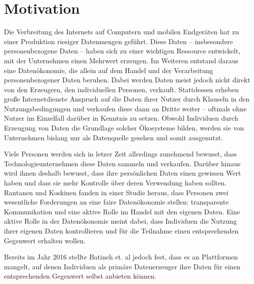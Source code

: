 \section{Motivation}
Die Verbreitung des Internets auf Computern und mobilen Endgeräten hat zu einer Produktion riesiger Datenmengen geführt. Diese Daten -- insbesondere personenbezogene Daten -- haben sich zu einer wichtigen Ressource entwickelt, mit der Unternehmen einen Mehrwert erzeugen. Im Weiteren entstand daraus eine Datenökonomie, die allein auf dem Handel und der Verarbeitung personenbezogener Daten beruhen. \cite{humanDemand_2020} Dabei werden Daten meist jedoch nicht direkt von den Erzeugern, den individuellen Personen, verkauft. Stattdessen erheben große Internetdienste Anspruch auf die Daten ihrer Nutzer durch Klauseln in den Nutzungsbedingungen und verkaufen diese dann an Dritte weiter -- oftmals ohne Nutzer im Einzelfall darüber in Kenntnis zu setzen. Obwohl Individuen durch Erzeugung von Daten die Grundlage solcher Ökosysteme bilden, werden sie von Unternehmen bislang nur als Datenquelle gesehen und somit ausgenutzt. \cite{monetizingData_2016} \newline

\noindent Viele Personen werden sich in letzer Zeit allerdings zunehmend bewusst, dass Technologieunternehmen diese Daten sammeln und verkaufen. Darüber hinaus wird ihnen deshalb bewusst, dass ihre persönlichen Daten einen gewissen Wert haben und dass sie mehr Kontrolle über deren Verwendung haben sollten. Rantanen und Koskinen fanden in einer Studie heraus, dass Personen zwei wesentliche Forderungen an eine faire Datenökonomie stellen: transparente Kommunikation und eine aktive Rolle im Handel mit den eigenen Daten. Eine aktive Rolle in der Datenökonomie meint dabei, dass Individuen die Nutzung ihrer eigenen Daten kontrollieren und für die Teilnahme einen entsprechenden Gegenwert erhalten wollen. \cite{humanDemand_2020} \newline

\noindent Bereits im Jahr 2016 stellte Batineh et. al jedoch fest, dass es an Plattformen mangelt, auf denen Individuen als primäre Datenerzeuger ihre Daten für einen entsprechenden Gegenwert selbst anbieten können. \cite{monetizingData_2016}